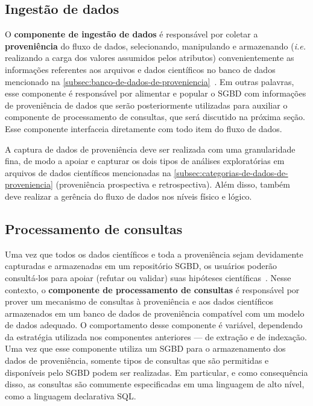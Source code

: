 \subsection{Ingestão de dados}%
\label{subsec:ingestao-de-dados}

O \textbf{componente de ingestão de dados} é responsável por coletar a \textbf{proveniência} do fluxo de dados, selecionando, manipulando e armazenando (\textit{i.e.} realizando a carga dos valores assumidos pelos atributos) convenientemente as informações referentes aos arquivos e dados científicos no banco de dados mencionado na \autoref{subsec:banco-de-dados-de-proveniencia}~\cite{silva2015propostadoutorado}. Em outras palavras, esse componente é responsável por alimentar e popular o SGBD com informações de proveniência de dados que serão posteriormente utilizadas para auxiliar o componente de processamento de consultas, que será discutido na próxima seção. Esse componente interfaceia diretamente com todo item do fluxo de dados.

A captura de dados de proveniência deve ser realizada com uma granularidade fina, de modo a apoiar e capturar os dois tipos de análises exploratórias em arquivos de dados científicos mencionadas na \autoref{subsec:categorias-de-dados-de-proveniencia} (proveniência prospectiva e retrospectiva). Além disso, também deve realizar a gerência do fluxo de dados nos níveis físico e lógico.

\subsection{Processamento de consultas}

Uma vez que todos os dados científicos e toda a proveniência sejam devidamente capturadas e armazenadas em um repositório SGBD, os usuários poderão consultá-los para apoiar (refutar ou validar) suas hipóteses científicas~\cite{silva2015propostadoutorado}. Nesse contexto, o \textbf{componente de processamento de consultas} é responsável por prover um mecanismo de consultas à proveniência e aos dados científicos armazenados em um banco de dados de proveniência compatível com um modelo de dados adequado. O comportamento desse componente é variável, dependendo da estratégia utilizada nos componentes anteriores --- de extração e de indexação. Uma vez que esse componente utiliza um SGBD para o armazenamento dos dados de proveniência, somente tipos de consultas que são permitidas e disponíveis pelo SGBD podem ser realizadas. Em particular, e como consequência disso, as consultas são comumente especificadas em uma linguagem de alto nível, como a linguagem declarativa SQL.

